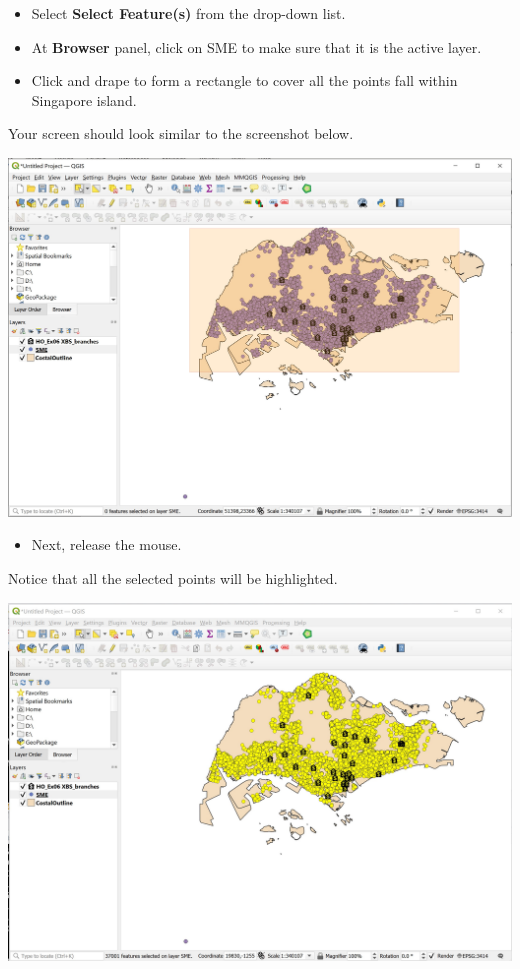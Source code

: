 \documentclass[
  letterpaper,
  DIV=11,
  numbers=noendperiod]{scrreprt}
\providecommand{\tightlist}{%
  \setlength{\itemsep}{0pt}\setlength{\parskip}{0pt}}\usepackage{longtable,booktabs,array}
\begin{document}
\begin{itemize}
\tightlist
\item
  Select \textbf{Select Feature(s)} from the drop-down list.
\item
  At \textbf{Browser} panel, click on SME to make sure that it is the
  active layer.
\item
  Click and drape to form a rectangle to cover all the points fall
  within Singapore island.
\end{itemize}

Your screen should look similar to the screenshot below.

\includegraphics{./img05/image11.jpg}

\begin{itemize}
\tightlist
\item
  Next, release the mouse.
\end{itemize}

Notice that all the selected points will be highlighted.

\includegraphics{./img05/image12.jpg}
\end{document}
